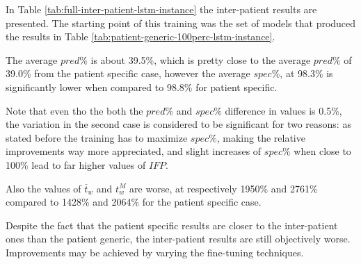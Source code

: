 In Table \ref{tab:full-inter-patient-lstm-instance} the inter-patient results are presented. The starting point of this training was the set of models that produced the results in Table \ref{tab:patient-generic-100perc-lstm-instance}.

The average $pred\%$ is about 39.5\%, which is pretty close to the average $pred\%$ of 39.0\% from the patient specific case, however the average $spec\%$, at 98.3\% is significantly lower when compared to 98.8\% for patient specific. 

Note that even tho the both the $pred\%$ and $spec\%$ difference in values is 0.5\%, the variation in the second case is considered to be significant for two reasons: as stated before the training has to maximize $spec\%$, making the relative improvements way more appreciated, and slight increases of $spec\%$ when close to 100\% lead to far higher values of $IFP$.

Also the values of $\overline{t}_w$ and $t_w^M$ are worse, at respectively 1950\% and 2761\% compared to 1428\% and 2064\% for the patient specific case.

Despite the fact that the patient specific results are closer to the inter-patient ones than the patient generic, the inter-patient results are still objectively worse. Improvements may be achieved by varying the fine-tuning techniques.

